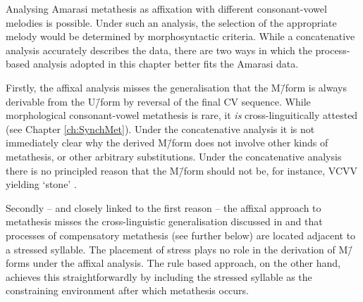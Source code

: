Analysing Amarasi metathesis as affixation
with different consonant-vowel melodies is possible.
Under such an analysis,
the selection of the appropriate melody
would be determined by morphosyntactic criteria.
While a concatenative analysis accurately describes the data,
there are two ways in which the process-based
analysis adopted in this chapter better fits the Amarasi data.

Firstly, the affixal analysis misses the generalisation
that the M\=/form is always derivable from the U\=/form
by reversal of the final CV sequence.
While morphological consonant-vowel metathesis is rare,
it \emph{is} cross-linguitically attested
(see Chapter \ref{ch:SynchMet}).
Under the concatenative analysis it is not
immediately clear why the derived M\=/form
does not involve other kinds of metathesis,
or other arbitrary substitutions.
Under the concatenative analysis
there is no principled reason that the M\=/form
should not be, for instance, VCVV yielding  `stone' {\ra} .

Secondly -- and closely linked to the first reason --
the affixal approach to metathesis
misses the cross-linguistic generalisation discussed
in  and 
that processes of compensatory metathesis (see further  below)
are located adjacent to a stressed syllable.
The placement of stress plays no role
in the derivation of M\=/forms under the affixal analysis.
The rule based approach, on the other hand,
achieves this straightforwardly by including the stressed
syllable as the constraining environment after which metathesis occurs.